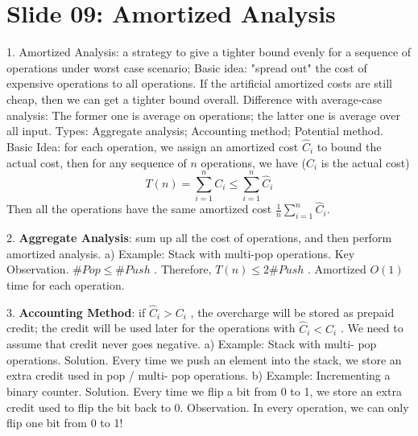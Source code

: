 \documentclass[10pt,a4paper]{article}
\begin{document}
\section*{Slide 09: Amortized Analysis}

1. Amortized Analysis: a strategy to give a tighter bound evenly for a sequence of operations under worst case scenario; Basic idea: "spread out" the cost of expensive operations to all operations. If the artificial amortized costs are still cheap, then we can get a tighter bound overall.
Difference with average-case analysis: The former one is average on operations; the latter one is average over all input.
Types: Aggregate analysis; Accounting method; Potential method.
Basic Idea: for each operation, we assign an amortized cost \(\hat{C}_{i}\) to bound the actual cost, then for any sequence of \(n\) operations, we have (\(C_{i}\) is the actual cost)
\[
T(n) = \sum_{i = 1}^{n}C_{i}\leq \sum_{i = 1}^{n}\hat{C}_{i}
\]
Then all the operations have the same amortized cost \(\frac{1}{n}\sum_{i = 1}^{n}\hat{C}_{i}\).

2. \textbf{Aggregate Analysis}: sum up all the cost of operations, and then perform amortized analysis.
a) Example: Stack with multi-pop operations.
Key Observation. \(\# Pop\leq \# Push\) . Therefore, \(T(n)\leq 2\# Push\) . Amortized \(O(1)\) time for each operation.

3. \textbf{Accounting Method}: if \(\widehat{C}_{i} > C_{i}\) , the overcharge will be stored as prepaid credit; the credit will be used later for the operations with \(\widehat{C}_{i} < C_{i}\) . We need to assume that credit never goes negative.
a) Example: Stack with multi- pop operations.
Solution. Every time we push an element into the stack, we store an extra credit used in pop / multi- pop operations.
b) Example: Incrementing a binary counter.
Solution. Every time we flip a bit from 0 to 1, we store an extra credit used to flip the bit back to 0.
Observation. In every operation, we can only flip one bit from 0 to 1!
\end{document}
